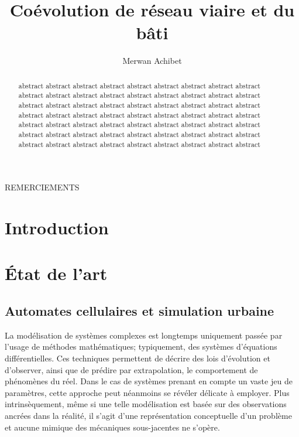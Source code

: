 \documentclass[10pt]{article}
\title{Coévolution de réseau viaire et du bâti}
\author{Merwan Achibet}
\date{}
\begin{document}
\maketitle

\begin{abstract}
abstract abstract abstract abstract abstract abstract abstract
abstract abstract abstract abstract abstract abstract abstract
abstract abstract abstract abstract abstract abstract abstract
abstract abstract abstract abstract abstract abstract abstract
abstract abstract abstract abstract abstract abstract abstract
abstract abstract abstract abstract abstract abstract abstract
abstract abstract abstract abstract abstract abstract abstract
abstract abstract abstract abstract abstract abstract abstract
abstract abstract abstract abstract abstract abstract abstract
\end{abstract}

\newpage

\tableofcontents

\newpage

REMERCIEMENTS

\newpage

\section{Introduction}

\section{\'Etat de l'art}

\subsection{Automates cellulaires et simulation urbaine}

La modélisation de systèmes complexes est longtemps uniquement passée
par l'usage de méthodes mathématiques; typiquement, des systèmes
d'équations différentielles. Ces techniques permettent de décrire des
lois d'évolution et d'observer, ainsi que de prédire par
extrapolation, le comportement de phénomènes du réel. Dans le cas de
systèmes prenant en compte un vaste jeu de paramètres, cette approche
peut néanmoins se révéler délicate à employer. Plus intrinsèquement,
même si une telle modélisation est basée sur des observations ancrées
dans la réalité, il s'agit d'une représentation conceptuelle d'un
problème et aucune mimique des mécaniques sous-jacentes ne s'opère.
\end{document}
